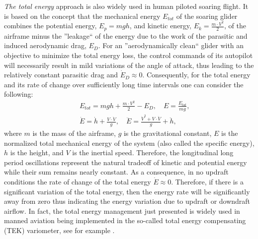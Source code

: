 \documentclass{ifacconf}
\begin{document}
\emph{The total energy} approach is also widely used in human piloted soaring
flight. It is based on the concept that the mechanical energy $E_{tot}$ of
the soaring glider combines the potential energy, $E_p=mgh$, and kinetic
energy, $E_k=\frac{m\cdot V^2}{2}$, of the airframe minus the ''leakage`` of
the energy due to the work of the parasitic and induced aerodynamic drag,
$E_{D}$. For an ''aerodynamically clean`` glider with an objective to
minimize the total energy loss, the control commands of its autopilot will
necessarily result in mild variations of the angle of attack, thus leading to
the relatively constant parasitic drag and $\dot{E}_{D}\approx0$.
Consequently, for the total energy and its rate of change over sufficiently
long time intervals one can consider the following:
\begin{eqnarray}
    && E_{tot}=mgh+\frac{m\cdot V^2}{2}-E_{D}, \quad E=\frac{E_{tot}}{mg}, \nonumber \\
    && \dot{E}=\dot{h}+\frac{V \cdot \dot{V}}{g}, \quad \ddot{E}=\frac{\dot{V}^2 + V \cdot
    \ddot{V}}{g} + \ddot{h},
    \label{eq:totenergyrate}
\end{eqnarray}
where $m$ is the mass of the airframe, $g$ is the gravitational constant, $E$
is the normalized total mechanical energy of the system (also called the
specific energy), $h$ is the height, and $V$ is the inertial speed.
Therefore, the longitudinal long period oscillations represent the natural
tradeoff of kinetic and potential energy while their sum remains nearly
constant. As a consequence, in no updraft conditions the rate of change of
the total energy $\dot{E}\approx 0$. Therefore, if there is a significant
variation of the total energy, then the energy rate will be significantly
away from zero thus indicating the energy variation due to updraft or
downdraft airflow. In fact, the total energy management just presented is
widely used in manned aviation being implemented in the so-called total
energy compensating (TEK) variometer, see for example
\cite{PitLab:2013:Online}.
\end{document}
